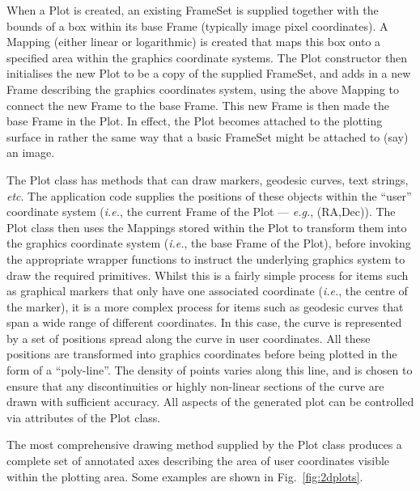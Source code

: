 \documentclass[final,authoryear,5p,times,twocolumn]{elsarticle}
\begin{document}
When a Plot is created, an existing FrameSet is supplied together with
the bounds of a box within its base Frame (typically image pixel
coordinates). A Mapping (either linear or logarithmic) is created that
maps this box onto a specified area within the graphics coordinate
systems. The Plot constructor then initialises the new Plot to be a copy
of the supplied FrameSet, and adds in a new Frame describing the graphics
coordinates system, using the above Mapping to connect the new Frame to
the base Frame. This new Frame is then made the base Frame in the Plot.
In effect, the Plot becomes attached to the plotting surface in rather
the same way that a basic FrameSet might be attached to (say) an image.

The Plot class has methods that can draw markers, geodesic curves, text
strings, \emph{etc}. The application code supplies the positions of these
objects within the ``user'' coordinate system (\emph{i.e.}, the current
Frame of the Plot --- \emph{e.g.}, (RA,Dec)). The Plot class then uses the
Mappings stored within the Plot to transform them into the graphics
coordinate system (\emph{i.e.}, the base Frame of the Plot), before
invoking the appropriate wrapper functions to instruct the underlying
graphics system to draw the required primitives. Whilst this is a fairly
simple process for items such as graphical markers that only have one
associated coordinate (\emph{i.e.}, the centre of the marker), it is a
more complex process for items such as geodesic curves that span a wide
range of different coordinates. In this case, the curve is represented by
a set of positions spread along the curve in user coordinates. All these
positions are transformed into graphics coordinates before being plotted
in the form of a ``poly-line''. The density of points varies along this
line, and is chosen to ensure that any discontinuities or highly
non-linear sections of the curve are drawn with sufficient accuracy. All
aspects of the generated plot can be controlled via attributes of the Plot
class.

The most comprehensive drawing method supplied by the Plot class produces
a complete set of annotated axes describing the area of user coordinates
visible within the plotting area. Some examples are shown in
Fig.~\ref{fig:2dplots}.
\end{document}
